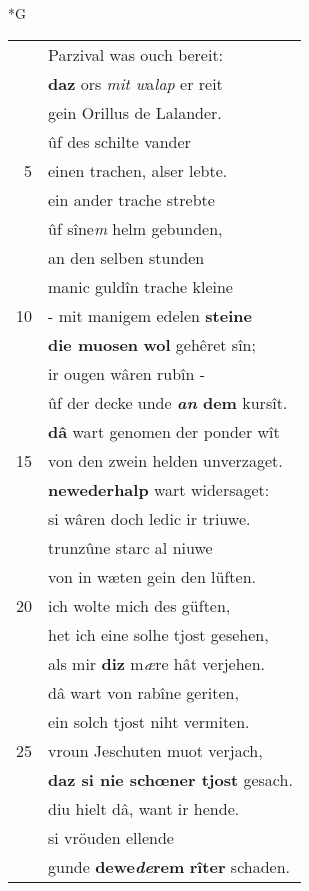 \documentclass[8pt,a4paper,notitlepage]{article}
\begin{document}
\newpage
\begin{table}[ht]
\begin{minipage}[t]{0.5\linewidth}
\small
\begin{center}*G
\end{center}
\begin{tabular}{rl}
 & Parzival was ouch bereit:\\ 
 & \textbf{daz} ors \textit{mit w}a\textit{lap} er reit\\ 
 & gein Orillus de Lalander.\\ 
 & ûf des schilte vander\\ 
5 & einen trachen, alser lebte.\\ 
 & ein ander trache strebte\\ 
 & ûf sîne\textit{m} helm gebunden,\\ 
 & an den selben stunden\\ 
 & manic guldîn trache kleine\\ 
10 & - mit manigem edelen \textbf{steine}\\ 
 & \textbf{die muosen} \textbf{wol} gehêret sîn;\\ 
 & ir ougen wâren rubîn -\\ 
 & ûf der decke unde \textbf{\textit{an} dem} kursît.\\ 
 & \textbf{dâ} wart genomen der ponder wît\\ 
15 & von den zwein helden unverzaget.\\ 
 & \textbf{newederhalp} wart widersaget:\\ 
 & si wâren doch ledic ir triuwe.\\ 
 & trunzûne starc al niuwe\\ 
 & von in wæten gein den lüften.\\ 
20 & ich wolte mich des güften,\\ 
 & het ich eine solhe tjost gesehen,\\ 
 & als mir \textbf{diz} m\textit{æ}re hât verjehen.\\ 
 & dâ wart von rabîne geriten,\\ 
 & ein solch tjost niht vermiten.\\ 
25 & vroun Jeschuten muot verjach,\\ 
 & \textbf{daz si nie schœner tjost} gesach.\\ 
 & diu hielt dâ, want ir hende.\\ 
 & si vröuden ellende\\ 
 & gunde \textbf{dewe\textit{de}rem} \textbf{rîter} schaden.\\ 

\end{tabular}
\end{minipage}
\end{table}
\end{document}
